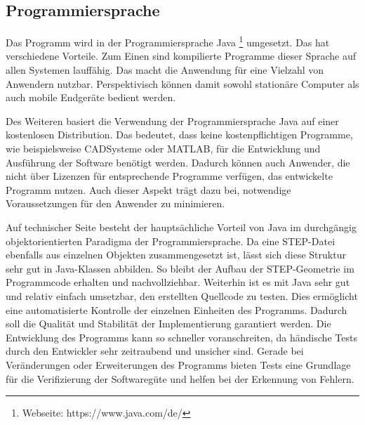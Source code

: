 \subsection{Programmiersprache} 
 
Das Programm wird in der Programmiersprache Java \footnote{Webseite: https://www.java.com/de/} umgesetzt. Das hat verschiedene Vorteile. Zum Einen sind kompilierte Programme dieser Sprache auf allen Systemen lauffähig. Das macht die Anwendung für eine Vielzahl von Anwendern nutzbar. Perspektivisch können damit sowohl stationäre Computer als auch mobile Endgeräte bedient werden.

Des Weiteren basiert die Verwendung der Programmiersprache Java auf einer kostenlosen Distribution. Das bedeutet, dass keine kostenpflichtigen Programme, wie beispielsweise CAD\-Sys\-teme oder MATLAB, für die Entwicklung und Ausführung der Software benötigt werden. Dadurch können auch Anwender, die nicht über Lizenzen für entsprechende Programme verfügen, das entwickelte Programm nutzen. Auch dieser Aspekt trägt dazu bei, notwendige Voraussetzungen für den Anwender zu minimieren.

Auf technischer Seite besteht der hauptsächliche Vorteil von Java im durchgängig objektorientierten Paradigma der Programmiersprache. Da eine STEP-Datei ebenfalls aus einzelnen Objekten zusammengesetzt ist, lässt sich diese Struktur sehr gut in Java-Klassen abbilden. So bleibt der Aufbau der STEP-Geometrie im Programmcode erhalten und nachvollziehbar. 
Weiterhin ist es mit Java sehr gut und relativ einfach umsetzbar, den erstellten Quellcode zu testen. Dies ermöglicht eine automatisierte Kontrolle der einzelnen Einheiten des Programms. Dadurch soll die Qualität und Stabilität der Implementierung garantiert werden. Die Entwicklung des Programms kann so schneller voranschreiten, da händische Tests durch den Entwickler sehr zeitraubend und unsicher sind. Gerade bei Veränderungen oder Erweiterungen des Programms bieten Tests eine Grundlage für die Verifizierung der Softwaregüte und helfen bei der Erkennung von Fehlern.     




       
 
